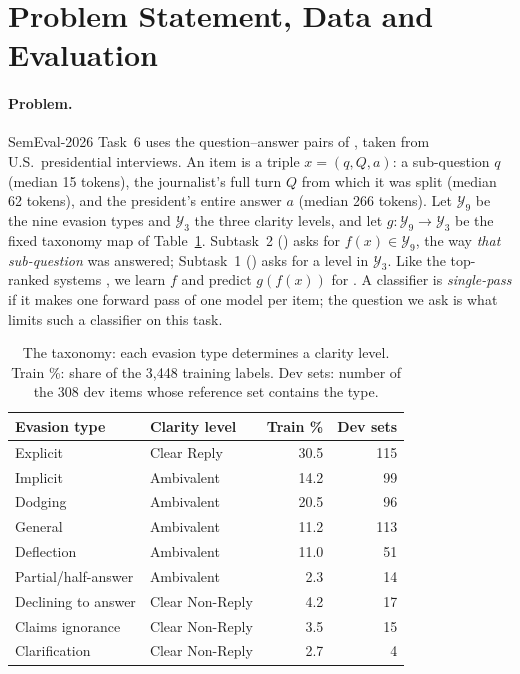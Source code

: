 \section{Problem Statement, Data and Evaluation}
\label{sec:task}

\paragraph{Problem.}
SemEval-2026 Task~6 \citep{thomas-etal-2026-semeval} uses the question--answer pairs of \citet{thomas-etal-2024-never}, taken from U.S.\ presidential interviews.
An item is a triple $x = (q, Q, a)$: a sub-question $q$ (median 15 tokens), the journalist's full turn $Q$ from which it was split (median 62 tokens), and the president's entire answer $a$ (median 266 tokens).
Let $\mathcal{Y}_9$ be the nine evasion types and $\mathcal{Y}_3$ the three clarity levels, and let $g:\mathcal{Y}_9 \rightarrow \mathcal{Y}_3$ be the fixed taxonomy map of Table~\ref{tab:taxonomy}.
Subtask~2 (\Stwo{}) asks for $f(x) \in \mathcal{Y}_9$, the way \emph{that sub-question} was answered; Subtask~1 (\Sone{}) asks for a level in $\mathcal{Y}_3$.
Like the top-ranked systems \citep{shi-etal-2026-teleai,peerachaidecho-rutherford-2026-chulanlp}, we learn $f$ and predict $g(f(x))$ for \Sone{}.
A classifier is \emph{single-pass} if it makes one forward pass of one model per item; the question we ask is what limits such a classifier on this task.

\begin{table}[t]
\centering
\small
\setlength{\tabcolsep}{3.5pt}
\begin{tabular}{@{}llrr@{}}
\toprule
Evasion type & Clarity level & Train \% & Dev sets \\
\midrule
Explicit            & Clear Reply     & 30.5 & 115 \\
\midrule
Implicit            & Ambivalent      & 14.2 & 99 \\
Dodging             & Ambivalent      & 20.5 & 96 \\
General             & Ambivalent      & 11.2 & 113 \\
Deflection          & Ambivalent      & 11.0 & 51 \\
Partial/half-answer & Ambivalent      & 2.3  & 14 \\
\midrule
Declining to answer & Clear Non-Reply & 4.2  & 17 \\
Claims ignorance    & Clear Non-Reply & 3.5  & 15 \\
Clarification       & Clear Non-Reply & 2.7  & 4 \\
\bottomrule
\end{tabular}
\caption{The taxonomy: each evasion type determines a clarity level. Train \%: share of the 3,448 training labels. Dev sets: number of the 308 dev items whose reference set contains the type.}
\label{tab:taxonomy}
\end{table}

